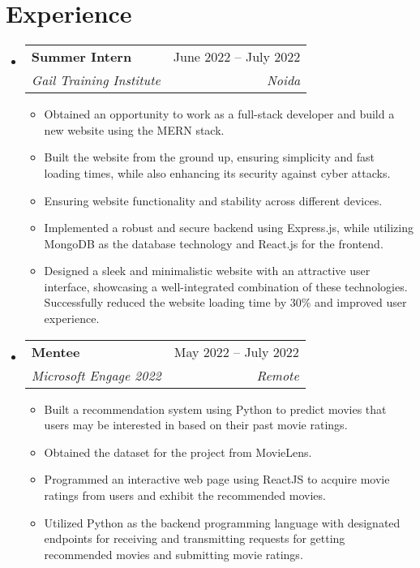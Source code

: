 \documentclass[a4paper,11pt]{article}
\makeatletter
\newcommand{\resumeItem}[1]{
    \item\small{
        {#1 \vspace{-4pt}}
    }
}
\newcommand{\resumeSubheading}[4]{
    \vspace{-2pt}\item
    \begin{tabular*}{0.97\textwidth}[t]{l@{\extracolsep{\fill}}r}
        \textbf{#1} & #2 \\
        \textit{\small#3} & \textit{\small #4} \\
    \end{tabular*}\vspace{-7pt}
}
\newcommand{\resumeSubSubheading}[2]{
    \item
    \begin{tabular*}{0.97\textwidth}{l@{\extracolsep{\fill}}r}
        \textit{\small#1} & \textit{\small #2} \\
    \end{tabular*}\vspace{-7pt}
}
\newcommand{\resumeSubHeadingListStart}{\begin{itemize}[leftmargin=0.15in, label={}]}
\newcommand{\resumeSubHeadingListEnd}{\end{itemize}}
\newcommand{\resumeItemListStart}{\begin{itemize}}
\newcommand{\resumeItemListEnd}{\end{itemize}\vspace{-5pt}}
\makeatother
\begin{document}
\section{Experience}
\resumeSubHeadingListStart

\resumeSubheading
{Summer Intern}{June 2022 -- July 2022}
{Gail Training Institute}{Noida}
\resumeItemListStart
\resumeItem {Obtained an opportunity to work as a full-stack developer and build a new website using the MERN stack.}
\resumeItem {Built the website from the ground up, ensuring simplicity and fast loading times, while also enhancing its security against cyber attacks.}
\resumeItem {Ensuring website functionality and stability across different devices.}
\resumeItem {Implemented a robust and secure backend using Express.js, while utilizing MongoDB as the database technology and React.js for the frontend.}
\resumeItem{Designed a sleek and minimalistic website with an attractive user interface, showcasing a well-integrated combination of these technologies. Successfully reduced the website loading time by 30\% and improved user experience.}
\resumeItemListEnd


\resumeSubheading
{Mentee}{May 2022 -- July 2022}
{Microsoft Engage 2022}{Remote}
\resumeItemListStart
\resumeItem {Built a recommendation system using Python to predict movies that users may be interested in based on their past movie ratings.}
\resumeItem {Obtained the dataset for the project from MovieLens.}
\resumeItem{Programmed an interactive web page using ReactJS to acquire movie ratings from users and exhibit the recommended movies.}
\resumeItem {Utilized Python as the backend programming language with designated endpoints for receiving and transmitting requests for getting recommended movies and submitting movie ratings.}
\resumeItemListEnd

\resumeSubHeadingListEnd


\end{document}
